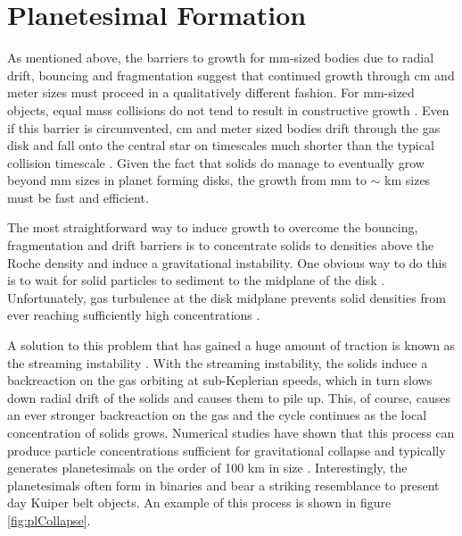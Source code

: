 \section{Planetesimal Formation}

As mentioned above, the barriers to growth for mm-sized bodies due to radial drift, bouncing and fragmentation suggest that continued growth through cm and meter sizes must proceed in a qualitatively different fashion. For mm-sized objects, equal mass collisions do not tend to result in constructive growth \cite{windmark12}. Even if this barrier is circumvented, cm and meter sized bodies drift through the gas disk and fall onto the central star on timescales much shorter than the typical collision timescale \cite{weidenschilling77}. Given the fact that solids do manage to eventually grow beyond mm sizes in planet forming disks, the growth from mm to $\sim$ km sizes must be fast and efficient.

The most straightforward way to induce growth to overcome the bouncing, fragmentation and drift barriers is to concentrate solids to densities above the Roche density and induce a gravitational instability. One obvious way to do this is to wait for solid particles to sediment to the midplane of the disk \cite{goldreich73}. Unfortunately, gas turbulence at the disk midplane prevents solid densities from ever reaching sufficiently high concentrations \cite{cuzzi93}. 

 A solution to this problem that has gained a huge amount of traction is known as the streaming instability \cite{youdin05}. With the streaming instability, the solids induce a backreaction on the gas orbiting at sub-Keplerian speeds, which in turn slows down radial drift of the solids and causes them to pile up. This, of course, causes an ever stronger backreaction on the gas and the cycle continues as the local concentration of solids grows. Numerical studies have shown that this process can produce particle concentrations sufficient for gravitational collapse and typically generates planetesimals on the order of 100 km in size \cite{johansen15, simon16, schafer17}. Interestingly, the planetesimals often form in binaries \cite{li19} and bear a striking resemblance to present day Kuiper belt objects. An example of this process is shown in figure \ref{fig:plCollapse}.
 
